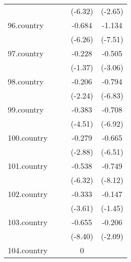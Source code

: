 {\begin{tabular}{l*{4}{c}}
            &                     &                     &     (-6.32)         &     (-2.65)         \\
[1em]
96.country  &                     &                     &      -0.684\sym{***}&      -1.134\sym{***}\\
            &                     &                     &     (-6.26)         &     (-7.51)         \\
[1em]
97.country  &                     &                     &      -0.228         &      -0.505\sym{**} \\
            &                     &                     &     (-1.37)         &     (-3.06)         \\
[1em]
98.country  &                     &                     &      -0.206\sym{*}  &      -0.794\sym{***}\\
            &                     &                     &     (-2.24)         &     (-6.83)         \\
[1em]
99.country  &                     &                     &      -0.383\sym{***}&      -0.708\sym{***}\\
            &                     &                     &     (-4.51)         &     (-6.92)         \\
[1em]
100.country &                     &                     &      -0.279\sym{**} &      -0.665\sym{***}\\
            &                     &                     &     (-2.88)         &     (-6.51)         \\
[1em]
101.country &                     &                     &      -0.538\sym{***}&      -0.749\sym{***}\\
            &                     &                     &     (-6.32)         &     (-8.12)         \\
[1em]
102.country &                     &                     &      -0.333\sym{***}&      -0.147         \\
            &                     &                     &     (-3.61)         &     (-1.45)         \\
[1em]
103.country &                     &                     &      -0.655\sym{***}&      -0.206\sym{*}  \\
            &                     &                     &     (-8.40)         &     (-2.09)         \\
[1em]
104.country &                     &                     &           0         &                     \\

\end{tabular}}
